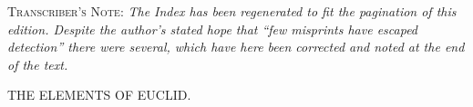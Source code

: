 \documentclass[oneside]{book}
\begin{document}
\bigskip\bigskip
\scriptsize \noindent \textsc{Transcriber's Note:} \emph{The Index has been regenerated
to fit the pagination of this edition. Despite the author's stated hope that ``few misprints
have escaped detection'' there were several, which have here been corrected and
noted at the end of the text.} \normalsize


\vfill
\begin{center}
\end{center}
\vfill
\newpage



\vfill
\begin{center}
{\Large THE ELEMENTS OF EUCLID.}
\end{center}
\vfill
\newpage


\vfill
\end{document}
